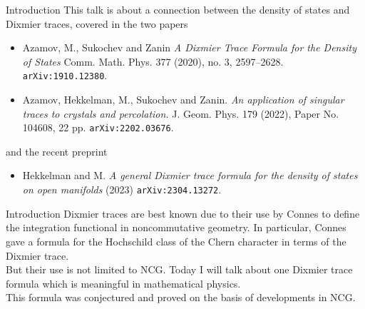 \documentclass{beamer}
\numberwithin{equation}{section}
\theoremstyle{plain}
\theoremstyle{plain}
\theoremstyle{definition}
\theoremstyle{plain}
\theoremstyle{plain}
\theoremstyle{definition}
\newcommand{\tr}{{\rm Tr}}
\newcommand{\Vol}{\mathrm{Vol}}
\newcommand{\Rl}{\mathbb{R}}
\begin{document}
\begin{frame}{Introduction}
This talk is about a connection between the density of states and Dixmier traces, covered in the two papers
\begin{itemize}
\item{} Azamov, M., Sukochev and Zanin \emph{A Dixmier Trace Formula for the Density of States} Comm. Math. Phys. 377 (2020), no. 3, 2597–2628.  \texttt{arXiv:1910.12380}.
\item{} Azamov, Hekkelman, M., Sukochev and Zanin. \emph{An application of singular traces to crystals and percolation.} J. Geom. Phys. 179 (2022), Paper No. 104608, 22 pp. \texttt{arXiv:2202.03676}.
\end{itemize}
and the recent preprint
\begin{itemize}
\item{} Hekkelman and M. \emph{A general Dixmier trace formula for the density of states on open manifolds} (2023) \texttt{arXiv:2304.13272}.
\end{itemize}

% 
% 
% 

% 

\end{frame}

\begin{frame}{Introduction}
    Dixmier traces are best known due to their use by Connes to define the integration functional in noncommutative geometry. In particular, Connes gave a formula for the Hochschild class of the Chern character in terms of the Dixmier trace. \\
    \pause
    But their use is not limited to NCG. Today I will talk about one Dixmier trace formula which is meaningful in mathematical physics. \\
    \pause
    This formula was conjectured and proved on the basis of developments in NCG.
\end{frame}
\end{document}
